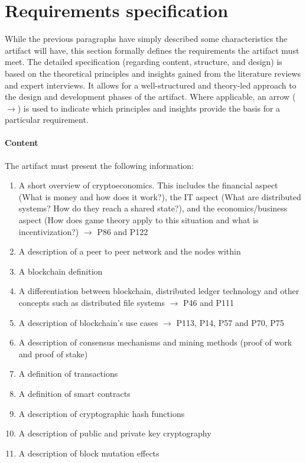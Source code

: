 \section{Requirements specification} \label{sec:ReqSpec}
While the previous paragraphs have simply described some characteristics the artifact will have, this section formally defines the requirements the artifact must meet. The detailed specification (regarding content, structure, and design) is based on the theoretical principles and insights gained from the literature reviews and expert interviews. It allows for a well-structured and theory-led approach to the design and development phases of the artifact. Where applicable, an arrow ($\rightarrow$) is used to indicate which principles and insights provide the basis for a particular requirement.

\paragraph{Content} The artifact must present the following information: 
\begin{enumerate}[nosep]
    \item A short overview of cryptoeconomics. This includes the financial aspect (What is money and how does it work?), the \ac{IT} aspect (What are distributed systems? How do they reach a shared state?), and the economics/business aspect (How does game theory apply to this situation and what is incentivization?) $\rightarrow$ \cite{RalphBeckmann_Interview} P86 and P122
    \item A description of a peer to peer network and the nodes within
    \item A blockchain definition 
    \item A differentiation between blockchain, distributed ledger technology and other concepts such as distributed file systems $\rightarrow$ \cite{DanielKaltenbach_Interview} P46 and \cite{RalphBeckmann_Interview} P111
    \item A description of blockchain's use cases $\rightarrow$ \cite{RalphBeckmann_Interview} P113, \cite{DanielKaltenbach_Interview} P14, P57 and \cite{BjoernPaulewicz_Interview} P70, P75
    \item A description of consensus mechanisms and mining methods (proof of work and proof of stake)
    \item A definition of transactions
    \item A definition of smart contracts
    \item A description of cryptographic hash functions
    \item A description of public and private key cryptography
    \item A description of block mutation effects
\setcounter{foo}{\value{enumi}}
\end{enumerate}

